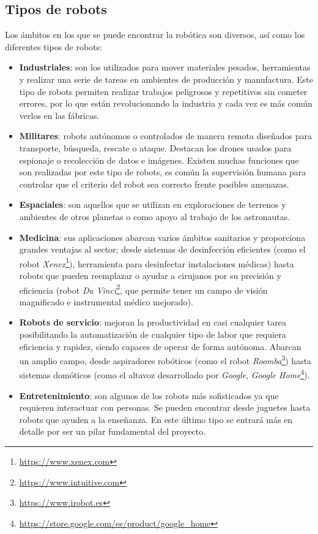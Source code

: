 \subsection{Tipos de robots}
\label{subsec:tiposRobots}
Los ámbitos en los que se puede encontrar la robótica son diversos, así como los diferentes tipos de robots: 
\begin{itemize}
    \item \textbf{Industriales}: son los utilizados para mover materiales pesados, herramientas y realizar una serie de tareas en ambientes de producción y manufactura. Este tipo de robots permiten realizar trabajos peligrosos y repetitivos sin cometer errores, por lo que están revolucionando la industria y cada vez es más común verlos en las fábricas.   
    \item \textbf{Militares}: robots autónomos o controlados de manera remota diseñados para transporte, búsqueda, rescate o ataque. Destacan los drones usados para espionaje o recolección de datos e imágenes. 
    Existen muchas funciones que son realizadas por este tipo de robots, es común la supervisión humana para controlar que el criterio del robot sea correcto frente posibles amenazas. 
    \item \textbf{Espaciales}: son aquellos que se utilizan en exploraciones de terrenos y ambientes de otros planetas o como apoyo al trabajo de los astronautas. 
    \item \textbf{Medicina}: sus aplicaciones abarcan varios ámbitos sanitarios y proporciona grandes ventajas al sector; desde sistemas de desinfección eficientes (como el robot \textit{Xenex}\footnote{\url{https://www.xenex.com}}), herramienta para desinfectar instalaciones médicas) hasta robots que pueden reemplazar o ayudar a cirujanos por su precisión y eficiencia (robot \textit{Da Vinci}\footnote{\url{https://www.intuitive.com}}, que permite tener un campo de visión magnificado e instrumental médico mejorado). 
    \item \textbf{Robots de servicio}: mejoran la productividad en casi cualquier tarea posibilitando la automatización de cualquier tipo de labor que requiera eficiencia y rapidez, siendo capaces de operar de forma autónoma. Abarcan un amplio campo, desde aspiradores robóticos (como el robot   \textit{Roomba}\footnote{\url{https://www.irobot.es}}) hasta sistemas domóticos (como el altavoz desarrollado por \textit{Google}, \textit{Google Home}\footnote{\url{https://store.google.com/es/product/google_home}}).
    \item \textbf{Entretenimiento}: son algunos de los robots más sofisticados ya que requieren interactuar con personas. Se pueden encontrar desde juguetes hasta robots que ayuden a la enseñanza. En este último tipo se entrará más en detalle por ser un pilar fundamental del proyecto.
\end{itemize}
